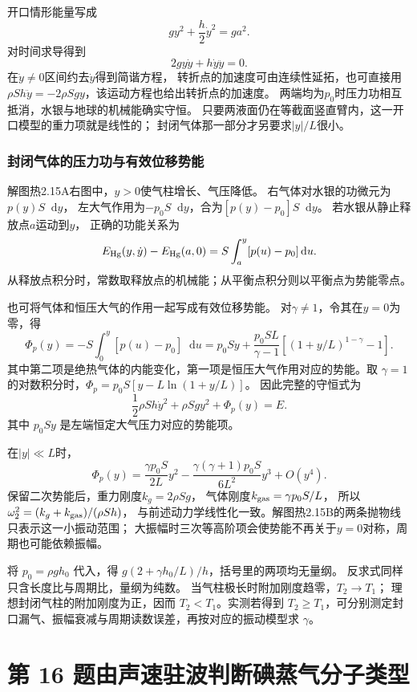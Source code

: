 \documentclass[UTF8,fontset=fandol,a4paper,11pt]{ctexart}
\newcommand{\dd}{\mathop{}\!\mathrm{d}}
\begin{document}
开口情形能量写成
\[
gy^2+\frac h2\dot y^2=ga^2.
\]
对时间求导得到
\[
2gy\dot y+h\dot y\ddot y=0.
\]
在$\dot y\ne0$区间约去$\dot y$得到简谐方程，
转折点的加速度可由连续性延拓，也可直接用
$\rho Sh\ddot y=-2\rho Sgy$，该运动方程也给出转折点的加速度。
两端均为$p_0$时压力功相互抵消，水银与地球的机械能确实守恒。
只要两液面仍在等截面竖直臂内，这一开口模型的重力项就是线性的；
封闭气体那一部分才另要求$|y|/L$很小。

\subsubsection*{封闭气体的压力功与有效位移势能}
解图热2.15A右图中，$y>0$使气柱增长、气压降低。
右气体对水银的功微元为$p(y)S\dd y$，
左大气作用为$-p_0S\dd y$，合为$[p(y)-p_0]S\dd y$。
若水银从静止释放点$a$运动到$y$，
正确的功能关系为
\[
E_{\rm Hg}(y,\dot y)-E_{\rm Hg}(a,0)
=S\int_a^y[p(u)-p_0]\dd u.
\]
从释放点积分时，常数取释放点的机械能；从平衡点积分则以平衡点为势能零点。

也可将气体和恒压大气的作用一起写成有效位移势能。
对$\gamma\ne1$，令其在$y=0$为零，得
\[
\Phi_p(y)=-S\int_0^y[p(u)-p_0]\dd u
=p_0Sy+\frac{p_0SL}{\gamma-1}
[(1+y/L)^{1-\gamma}-1].
\]
其中第二项是绝热气体的内能变化，第一项是恒压大气作用对应的势能。取 $\gamma=1$ 的对数积分时，$\Phi_p=p_0S[y-L\ln(1+y/L)]$。
因此完整的守恒式为
\[
\frac12\rho Sh\dot y^2+\rho Sgy^2+\Phi_p(y)=E.
\]
其中 $p_0Sy$ 是左端恒定大气压力对应的势能项。

在$|y|\ll L$时，
\[
\Phi_p(y)=\frac{\gamma p_0S}{2L}y^2
-\frac{\gamma(\gamma+1)p_0S}{6L^2}y^3+O(y^4).
\]
保留二次势能后，重力刚度$k_g=2\rho Sg$，
气体刚度$k_{\rm gas}=\gamma p_0S/L$，
所以$\omega_2^2=(k_g+k_{\rm gas})/(\rho Sh)$，
与前述动力学线性化一致。解图热2.15B的两条抛物线只表示这一小振动范围；
大振幅时三次等高阶项会使势能不再关于$y=0$对称，周期也可能依赖振幅。

将 $p_0=\rho gh_0$ 代入，得
$g(2+\gamma h_0/L)/h$，括号里的两项均无量纲。
反求式同样只含长度比与周期比，量纲为纯数。
当气柱极长时附加刚度趋零，$T_2\to T_1$；
理想封闭气柱的附加刚度为正，因而 $T_2<T_1$。实测若得到 $T_2\ge T_1$，可分别测定封口漏气、振幅衰减与周期读数误差，再按对应的振动模型求 $\gamma$。




\section*{第 16 题\quad 由声速驻波判断碘蒸气分子类型}
\end{document}
